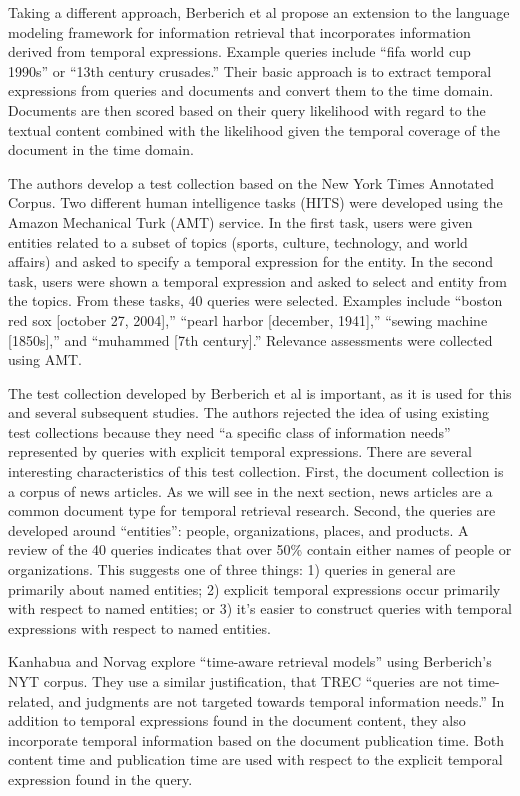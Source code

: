 \documentclass{sig-alternate}
\begin{document}
Taking a different approach, Berberich et al \cite{Berberich2010} propose an extension to the language modeling framework for information retrieval that incorporates information derived from temporal expressions.  Example queries include ``fifa world cup 1990s'' or ``13th century crusades.'' Their basic approach is to extract temporal expressions from queries and documents and convert them to the time domain. Documents are then scored based on their query likelihood with regard to the textual content combined with the likelihood given the temporal coverage of the document in the time domain.

The authors develop a test collection based on the New York Times Annotated Corpus.  Two different human intelligence tasks (HITS) were developed using the Amazon Mechanical Turk (AMT) service. In the first task, users were given entities related to a subset of topics (sports, culture, technology, and world affairs) and asked to specify a temporal expression for the entity. In the second task, users were shown a temporal expression and asked to select and entity from the topics. From these tasks, 40 queries were selected. Examples include ``boston red sox [october 27, 2004],'' ``pearl harbor [december, 1941],'' ``sewing machine [1850s],'' and ``muhammed [7th century].''   Relevance assessments were collected using AMT.

The test collection developed by Berberich et al is important, as it is used for this and several subsequent studies. The authors rejected the idea of using existing test collections because they need ``a specific class of information needs'' represented by queries with explicit temporal expressions.  There are several interesting characteristics of this test collection.  First, the document collection is a corpus of news articles. As we will see in the next section, news articles are a common document type for temporal retrieval research.  Second, the queries are developed around ``entities'': people, organizations, places, and products. A review of the 40 queries indicates that over 50\% contain either names of people or organizations. This suggests one of three things: 1) queries in general are primarily about named entities; 2) explicit temporal expressions occur primarily with respect to named entities; or 3) it's easier to construct queries with temporal expressions with respect to named entities.  

Kanhabua and Norvag \cite{Kanhabua2011} explore ``time-aware retrieval models'' using Berberich's NYT corpus. They use a similar justification, that TREC ``queries are not time-related, and judgments are not targeted towards temporal information needs.'' In addition to temporal expressions found in the document content, they also incorporate temporal information based on the document publication time. Both content time and publication time are used with respect to the explicit temporal expression found in the query.
\end{document}
